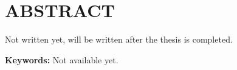 \clearpage
{}
\chapter*{ABSTRACT}


\hs Not written yet, will be written after the thesis is completed.

\vspace{0.5cm}
\noindent\textbf{Keywords:} Not available yet.
